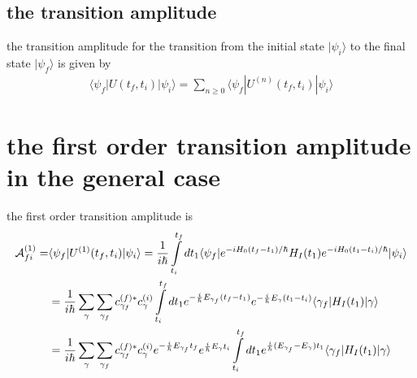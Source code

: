 \subsection{the transition amplitude}
the transition amplitude for the transition from the initial state $|\psi_i\rangle$ to the final state $|\psi_f\rangle$ is given by
\begin{align}
    \langle \psi_f | U(t_f,t_i) | \psi_i \rangle = \sum\limits_{n\ge0}\langle \psi_f | U^{(n)}(t_f,t_i) | \psi_i \rangle
\end{align}
\newpage
\section{the first order transition amplitude in the general case}
the first order transition amplitude is
\begin{align}
    {\cal A}_{fi}^{(1)} = & \langle \psi_f | U^{(1)}(t_f,t_i) | \psi_i \rangle = \frac{1}{i\hbar} \int\limits_{t_i}^{t_f}dt_1 \langle \psi_f | e^{-iH_0(t_f-t_1)/\hbar} H_I(t_1) e^{-iH_0(t_1-t_i)/\hbar} | \psi_i \rangle\nonumber                                                                                  \\
    & = \frac{1}{i\hbar} \sum\limits_{\gamma}\sum\limits_{\gamma_f}c_{\gamma_f}^{(f)*} c_{\gamma}^{(i)}\int\limits_{t_i}^{t_f}dt_1e^{-\frac{i}{\hbar}E_{\gamma_f} (t_f-t_1)}e^{-\frac{i}{\hbar}E_{\gamma}(t_1-t_i)}\langle \gamma_f |H_I(t_1)| \gamma\rangle\nonumber                          \\
    & =\frac{1}{i\hbar} \sum\limits_{\gamma}\sum\limits_{\gamma_f}c_{\gamma_f}^{(f)*} c_{\gamma}^{(i)}e^{-\frac{i}{\hbar}E_{\gamma_f} t_f}e^{\frac{i}{\hbar}E_{\gamma} t_i}\int\limits_{t_i}^{t_f}dt_1e^{\frac{i}{\hbar}(E_{\gamma_f}-E_{\gamma})t_1}\langle \gamma_f |H_I(t_1)| \gamma\rangle
\end{align}

